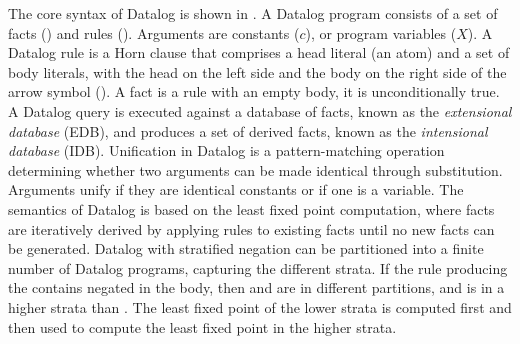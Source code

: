 The core syntax of Datalog is shown in . 
A Datalog program consists of a set of facts () and rules (\code{\m{\drule^*}}). 
Arguments are constants ($c$), or program variables ($X$).
A Datalog rule is a Horn clause that comprises a head literal (an atom) and a set of body literals, with the head on the left side and the body on the right side of the arrow symbol (\datalogarrow).
A fact is a rule with an empty body, \ie it is unconditionally true. 
A Datalog query is executed against a database of facts, known as the \emph{extensional database} (EDB), and produces a set of derived facts, known as the \emph{intensional database} (IDB). 
Unification in Datalog is a pattern-matching operation determining whether two arguments can be made identical through substitution. Arguments unify if they are identical constants or if one is a variable. 
The semantics of Datalog is based on the least fixed point computation, where facts are iteratively derived by applying rules to existing facts until no new facts can be generated. 
Datalog with stratified negation can be partitioned into a finite number of Datalog programs, capturing the different strata. 
If the rule producing the \code{\relation} contains \code{\relation^\prime} negated in the body, then \code{\relation} and \code{\relation^\prime} are in different partitions, and \code{\relation} is in a higher strata than \code{\relation^\prime}. 
The least fixed point of the lower strata is computed first and then used to compute the least fixed point in the higher strata. 


